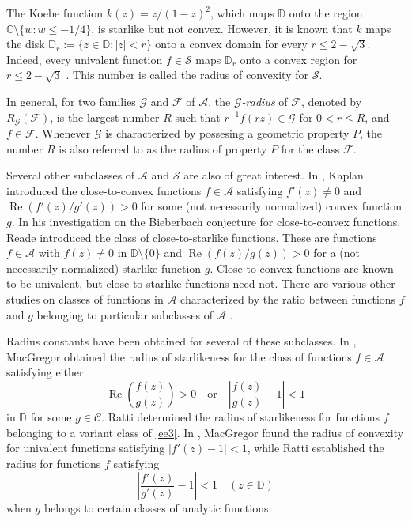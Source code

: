\documentclass{amsart}
\begin{document}
The Koebe function $k(z)=z/(1-z)^2$, which maps $\mathbb{D}$ onto the region $\mathbb{C}\setminus \{ w: w\leq -1/4\}$, is starlike but not convex. However, it is known that $k$ maps the disk $\mathbb{D}_r:=\{z\in\mathbb{D} : |z|<r \}$ onto a convex domain for every $r\leq 2-\sqrt{3}$. Indeed, every univalent function $f\in \mathcal{S}$ maps $\mathbb{D}_r$ onto a convex region for $r\leq 2-\sqrt{3}$ \cite[Theorem 2.13, p.\ 44]{duren}. This number is called the radius of convexity for $\mathcal{S}$.

In general, for two families $\mathcal{G}$ and $\mathcal{F}$ of $\mathcal{A}$, the \emph{$\mathcal{G}$-radius} of $\mathcal{F}$, denoted by $R_\mathcal{G}(\mathcal{F})$, is the largest number $R$ such that $r^{-1}f(rz)\in\mathcal{G}$ for $0< r\leq R$, and $f \in \mathcal{F}$. Whenever $\mathcal{G}$ is characterized by possesing a geometric property $P$, the number $R$ is also referred to as the radius of property $P$ for the class $\mathcal{F}$.

Several other subclasses of $\mathcal{A}$ and $\mathcal{S}$ are also of great interest. In \cite{kaplan}, Kaplan introduced the close-to-convex functions $f\in \mathcal{A}$ satisfying $f'(z)\neq0$ and $\operatorname{Re} (f'(z)/g'(z))>0$ for some (not necessarily normalized) convex function $g$. In his investigation on the Bieberbach conjecture for close-to-convex functions, Reade \cite{reade} introduced the class of close-to-starlike functions. These are functions $f\in \mathcal{A}$ with $f(z)\neq0$ in $\mathbb{D}\setminus\{0\}$ and $\operatorname{Re} (f(z)/g(z))>0$ for a (not necessarily normalized) starlike function $g$. Close-to-convex functions are known to be univalent, but close-to-starlike functions need not.  There are various other studies on classes of functions in $\mathcal{A}$ characterized by the ratio between functions $f$ and $g$ belonging to particular subclasses of $\mathcal{A}$ \cite{bajpai,bhargava,causey,chen,goel,goelb,goel72,krzyz,ksp1,ksp2,mac2,mac1,mac4,mac3,ratti68,ratti70,ratti80,reade,reade65,singh,vravicmft,shah,shukla,tuan}.

Radius constants have been obtained for several of these subclasses. In \cite{mac4, mac3}, MacGregor obtained the radius of starlikeness for the class of functions $f\in\mathcal{A}$ satisfying either
\begin{equation}\label{ee3}
\operatorname{Re}\left(\frac{f(z)}{g(z)}\right)>0
\quad \text{or}\quad
 \left|\frac{f(z)}{g(z)}-1\right|<1
\end{equation} in $ \mathbb{D}$
for some $g\in\mathcal{C}$.  Ratti \cite{ratti68} determined the radius of starlikeness for functions $f$ belonging to a variant class of \eqref{ee3}.
In \cite{mac2},   MacGregor  found the radius of convexity for univalent functions satisfying $|f'(z)-1|<1$, while Ratti \cite{ratti70} established the radius for functions $f$  satisfying
\begin{equation*}
 \left|\frac{f'(z)}{g'(z)}-1\right|<1\quad ( z\in \mathbb{D})
\end{equation*}
when $g$ belongs to certain classes of analytic functions.
\end{document}
